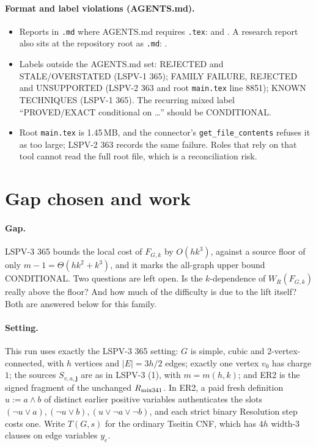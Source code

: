 \documentclass[11pt]{article}
\begin{document}
\paragraph{Format and label violations (AGENTS.md).}
\begin{itemize}
\item Reports in \texttt{.md} where AGENTS.md requires \texttt{.tex}:  and . A research report also sits at the repository root as \texttt{.md}: .
\item Labels outside the AGENTS.md set: REJECTED and STALE/OVERSTATED (LSPV-1 365); FAMILY FAILURE, REJECTED and UNSUPPORTED (LSPV-2 363 and root \texttt{main.tex} line 8851); KNOWN TECHNIQUES (LSPV-1 365). The recurring mixed label ``PROVED/EXACT conditional on \ldots'' should be CONDITIONAL.
\item Root \texttt{main.tex} is 1.45\,MB, and the connector's \texttt{get\_file\_contents} refuses it as too large; LSPV-2 363 records the same failure. Roles that rely on that tool cannot read the full root file, which is a reconciliation risk.
\end{itemize}

\section{Gap chosen and work}
\paragraph{Gap.} LSPV-3 365 bounds the local cost of $F_{G,k}$ by $O(hk^3)$, against a source floor of only $m-1=\Theta(hk^2+k^3)$, and it marks the all-graph upper bound CONDITIONAL. Two questions are left open. Is the $k$-dependence of $W_R(F_{G,k})$ really above the floor? And how much of the difficulty is due to the lift itself? Both are answered below for this family.

\paragraph{Setting.} This run uses exactly the LSPV-3 365 setting: $G$ is simple, cubic and 2-vertex-connected, with $h$ vertices and $|E|=3h/2$ edges; exactly one vertex $v_0$ has charge $1$; the sources $S_{v,a,\mathbf j}$ are as in LSPV-3 (1), with $m=m(h,k)$; and ER2 is the signed fragment of the unchanged $R_{\rm mix341}$. In ER2, a paid fresh definition $u:=a\wedge b$ of distinct earlier positive variables authenticates the slots $(\neg u\vee a),(\neg u\vee b),(u\vee\neg a\vee\neg b)$, and each strict binary Resolution step costs one. Write $T(G,s)$ for the ordinary Tseitin CNF, which has $4h$ width-3 clauses on edge variables $y_e$.
\end{document}
